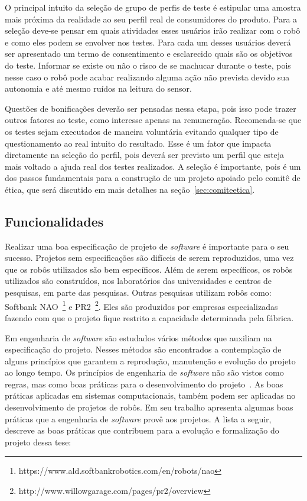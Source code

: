 O principal intuito da seleção de grupo de perfis de teste é estipular uma amostra mais próxima da realidade ao seu perfil real de consumidores do produto. Para a seleção deve-se pensar em quais atividades esses usuários irão realizar com o robô e como eles podem se envolver nos testes. Para cada um desses usuários deverá ser apresentado um termo de consentimento e esclarecido quais são os objetivos do teste. Informar se existe ou não o risco de se machucar durante o teste, pois nesse caso o robô pode acabar realizando alguma ação não prevista devido sua autonomia e até mesmo ruídos na leitura do sensor. 

Questões de bonificações deverão ser pensadas nessa etapa, pois isso pode trazer outros fatores ao teste, como interesse apenas na remuneração. Recomenda-se que os testes sejam executados de maneira voluntária evitando qualquer tipo de questionamento ao real intuito do resultado. Esse é um fator que impacta diretamente na seleção do perfil, pois deverá ser previsto um perfil que esteja mais voltado a ajuda real dos testes realizados. A seleção é importante, pois é um dos passos fundamentais para a construção de um projeto apoiado pelo comitê de ética, que será discutido em mais detalhes na seção~\ref{sec:comiteetica}.

\subsection{Funcionalidades}
\label{sec:funcionalidades}
Realizar uma boa especificação de projeto de \textit{software} é importante para o seu sucesso. Projetos sem especificações são difíceis de serem reproduzidos, uma vez que os robôs utilizados são bem específicos. Além de serem específicos, os robôs utilizados são construídos, nos laboratórios das universidades e centros de pesquisas, em parte das pesquisas. Outras pesquisas utilizam robôs como: Softbank NAO~\footnote{https://www.ald.softbankrobotics.com/en/robots/nao} e PR2~\footnote{http://www.willowgarage.com/pages/pr2/overview}. Eles são produzidos por empresas especializadas fazendo com que o projeto fique restrito a capacidade determinada pela fábrica.

Em engenharia de \emph{software} são estudados vários métodos que auxiliam na especificação do projeto. Nesses métodos são encontrados a contemplação de alguns princípios que garantem a reprodução, manutenção e evolução do projeto ao longo tempo. Os princípios de engenharia de \emph{software} não são vistos como regras, mas como boas práticas para o desenvolvimento do projeto~\cite{wazlawick:2013}. As boas práticas aplicadas em sistemas computacionais, também podem ser aplicadas no desenvolvimento de projetos de robôs. Em seu trabalho \textcite{wazlawick:2013} apresenta algumas boas práticas que a engenharia de \emph{software} provê aos projetos. A lista a seguir, descreve as boas práticas que contribuem para a evolução e formalização do projeto dessa tese:

